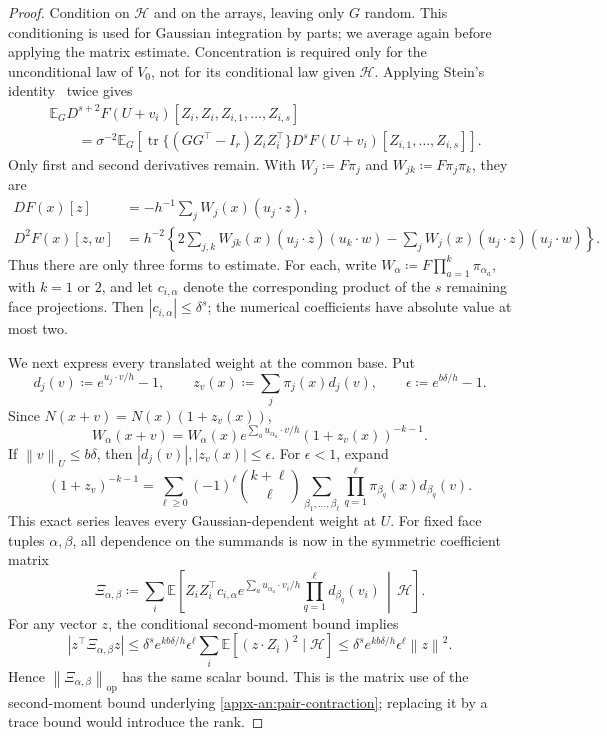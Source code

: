 \documentclass[11pt,letterpaper]{article}
\theoremstyle{remark}
\newcommand{\E}{\mathbb E}
\newcommand{\tr}{\operatorname{tr}}
\newcommand{\op}{\mathrm{op}}
\newcommand{\norm}[1]{\left\lVert#1\right\rVert}
\begin{document}
\begin{proof}
Condition on \(\mathcal H\) and on the arrays, leaving only \(G\)
random. This conditioning is used for Gaussian integration by parts;
we average again before applying the matrix estimate. Concentration
is required only for the unconditional law of \(V_0\), not for its
conditional law given \(\mathcal H\). Applying Stein's
identity~\cite{Stein1981} twice gives
\begin{align*}
 &\E_G D^{s+2}F(U+v_i)[Z_i,Z_i,Z_{i,1},\ldots,Z_{i,s}]\\
 &\qquad=\sigma^{-2}\E_G\left[
       \tr\{(GG^\top-I_r)Z_iZ_i^\top\}
       D^sF(U+v_i)[Z_{i,1},\ldots,Z_{i,s}]\right].
\end{align*}
Only first and second derivatives remain. With
\(W_j\coloneqq F\pi_j\) and \(W_{jk}\coloneqq F\pi_j\pi_k\), they are
\begin{align*}
 DF(x)[z]&=-h^{-1}\sum_jW_j(x)(u_j\cdot z),\\
 D^2F(x)[z,w]&=h^{-2}\left\{
       2\sum_{j,k}W_{jk}(x)(u_j\cdot z)(u_k\cdot w)
       -\sum_jW_j(x)(u_j\cdot z)(u_j\cdot w)\right\}.
\end{align*}
Thus there are only three forms to estimate. For each, write
\(W_\alpha\coloneqq F\prod_{a=1}^k\pi_{\alpha_a}\), with \(k=1\) or \(2\),
and let \(c_{i,\alpha}\) denote the corresponding product of the
\(s\) remaining face projections. Then \(|c_{i,\alpha}|\le\delta^s\);
the numerical coefficients have absolute value at most two.

We next express every translated weight at the common base. Put
\[
 d_j(v)\coloneqq e^{u_j\cdot v/h}-1,\qquad
 z_v(x)\coloneqq \sum_j\pi_j(x)d_j(v),\qquad
 \epsilon\coloneqq e^{b\delta/h}-1.
\]
Since \(N(x+v)=N(x)(1+z_v(x))\),
\begin{equation}
 W_\alpha(x+v)=W_\alpha(x)
 e^{\sum_a u_{\alpha_a}\cdot v/h}(1+z_v(x))^{-k-1}.
 \label{eq:weight-translation}
\end{equation}
If \(\norm v_U\le b\delta\), then \(|d_j(v)|,|z_v(x)|\le\epsilon\).
For \(\epsilon<1\), expand
\[
 (1+z_v)^{-k-1}
 =\sum_{\ell\ge0}(-1)^\ell\binom{k+\ell}{\ell}
       \sum_{\beta_1,\ldots,\beta_\ell}
       \prod_{q=1}^\ell\pi_{\beta_q}(x)d_{\beta_q}(v).
\]
This exact series leaves every Gaussian-dependent weight at \(U\).
For fixed face tuples \(\alpha,\beta\), all dependence on the
summands is now in the symmetric coefficient matrix
\[
 \Xi_{\alpha,\beta}\coloneqq \sum_i\E\left[
 Z_iZ_i^\top c_{i,\alpha}
 e^{\sum_a u_{\alpha_a}\cdot v_i/h}
 \prod_{q=1}^\ell d_{\beta_q}(v_i)\,\middle|\,\mathcal H\right].
\]
For any vector \(z\), the conditional second-moment bound implies
\[
 |z^\top\Xi_{\alpha,\beta}z|
 \le\delta^s e^{kb\delta/h}\epsilon^\ell
       \sum_i\E[(z\cdot Z_i)^2\mid\mathcal H]
 \le\delta^s e^{kb\delta/h}\epsilon^\ell\norm z^2.
\]
Hence \(\norm{\Xi_{\alpha,\beta}}_\op\) has the same scalar bound.
This is the matrix use of the second-moment bound underlying
\eqref{appx-an:pair-contraction}; replacing it by a trace bound
would introduce the rank.


\end{proof}
\end{document}
